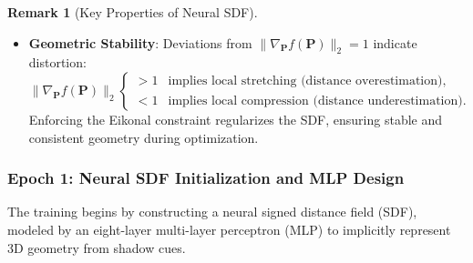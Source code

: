 \documentclass[12pt,a4paper]{article}
\theoremstyle{definition}
\newtheorem{remark}{Remark}[subsection]
\begin{document}
\begin{remark}[Key Properties of Neural SDF]
\begin{itemize}
    \subsubsection*{Proof of Eikonal Regularization}

    Let $\mathbf{P} \in \mathbb{R}^3$ and $\mathbf{u}$ a unit vector, $\|\mathbf{u}\|_2 = 1$ and $|\sigma| \ll 1$. By first-order Taylor expansion:
    \[
    f(\mathbf{P} + \sigma \mathbf{u}) \approx f(\mathbf{P}) + \sigma \, \nabla_{\mathbf{P}} f(\mathbf{P}) \cdot \mathbf{u}.
    \]

    Let $\theta$ be the angle between $\nabla_{\mathbf{P}} f(\mathbf{P})$ and $\mathbf{u}$. Then
    \[
    \Delta f = f(\mathbf{P} + \sigma \mathbf{u}) - f(\mathbf{P}) \approx \sigma \, \nabla_{\mathbf{P}} f(\mathbf{P}) \cdot \mathbf{u} \approx \sigma \, \|\nabla_{\mathbf{P}} f(\mathbf{P})\|_2 \cos \theta.
    \]

    For $f$ to be a valid signed distance function, the change along any direction must equal the displacement:
    \[
    \Delta f = \sigma \cos \theta \quad \implies \quad \boxed{\|\nabla_{\mathbf{P}} f(\mathbf{P})\|_2 = 1}.
    \]

    \item \textbf{Geometric Stability}: Deviations from $\|\nabla_{\mathbf{P}} f(\mathbf{P})\|_2 = 1$ indicate distortion:
    \[
    \|\nabla_{\mathbf{P}} f(\mathbf{P})\|_2
    \begin{cases}
    > 1 & \text{implies local stretching (distance overestimation)}, \\
    < 1 & \text{implies local compression (distance underestimation)}.
    \end{cases}
    \]
    Enforcing the Eikonal constraint regularizes the SDF, ensuring stable and consistent geometry during optimization.
    
\end{itemize}
\end{remark}

\subsubsection{Epoch 1: Neural SDF Initialization and MLP Design} \label{sec:epoch1_neural_sdf}

The training begins by constructing a neural signed distance field (SDF), modeled by an eight-layer multi-layer perceptron (MLP) to implicitly represent 3D geometry from shadow cues. 
\end{document}
